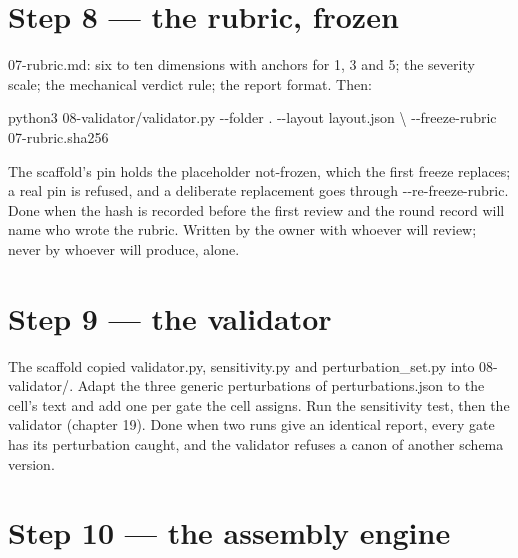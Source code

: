 \documentclass[
  american,
  10pt,
]{report}
\newenvironment{Shaded}{\begin{snugshade}}{\end{snugshade}}
\newcommand{\AttributeTok}[1]{\textcolor[rgb]{0.13,0.29,0.53}{#1}}
\newcommand{\DataTypeTok}[1]{\textcolor[rgb]{0.13,0.29,0.53}{#1}}
\newcommand{\ExtensionTok}[1]{#1}
\newcommand{\NormalTok}[1]{#1}
\renewenvironment{Shaded}{%
  \def\FrameCommand{{\color{rulecolor}\vrule width 2pt}\hspace{6pt}\colorbox{shadecolor}}%
  \MakeFramed{\advance\hsize-\width\FrameRestore}\small}%
  {\endMakeFramed}
\renewcommand{\texttt}[1]{{\ttfamily\hyphenchar\font=-1 #1}}
\begin{document}
\section{Step 8 --- the rubric, frozen}\label{step-8-the-rubric-frozen}

\texttt{07-\allowbreak{}rubric.\allowbreak{}md}: six to ten dimensions
with anchors for 1, 3 and 5; the severity scale; the mechanical verdict
rule; the report format. Then:

\begin{Shaded}
\begin{Highlighting}[]
\ExtensionTok{python3}\NormalTok{ 08{-}validator/validator.py }\AttributeTok{{-}{-}folder}\NormalTok{ . }\AttributeTok{{-}{-}layout}\NormalTok{ layout.json }\DataTypeTok{\textbackslash{}}
    \AttributeTok{{-}{-}freeze{-}rubric}\NormalTok{ 07{-}rubric.sha256}
\end{Highlighting}
\end{Shaded}

The scaffold's pin holds the placeholder
\texttt{not-\allowbreak{}frozen}, which the first freeze replaces; a
real pin is refused, and a deliberate replacement goes through
\texttt{-\allowbreak{}-\allowbreak{}re-\allowbreak{}freeze-\allowbreak{}rubric}.
Done when the hash is recorded before the first review and the round
record will name who wrote the rubric. Written by the owner with whoever
will review; never by whoever will produce, alone.

\section{Step 9 --- the validator}\label{step-9-the-validator}

The scaffold copied \texttt{validator.\allowbreak{}py},
\texttt{sensitivity.\allowbreak{}py} and
\texttt{perturbation\_\allowbreak{}set.\allowbreak{}py} into
\texttt{08-\allowbreak{}validator/\allowbreak{}}. Adapt the three
generic perturbations of \texttt{perturbations.\allowbreak{}json} to the
cell's text and add one per gate the cell assigns. Run the sensitivity
test, then the validator (chapter 19). Done when two runs give an
identical report, every gate has its perturbation caught, and the
validator refuses a canon of another schema version.

\section{Step 10 --- the assembly
engine}\label{step-10-the-assembly-engine}
\end{document}
